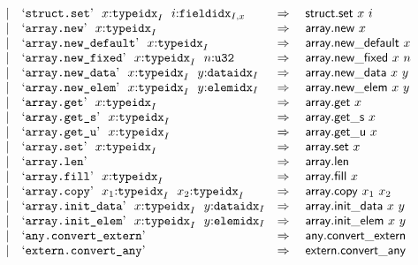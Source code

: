 $$\begin{array}[t]{@{}lrrl@{}l@{}l@{}l@{}}
& & | & \mbox{‘\texttt{struct.set}’}~~x{:}{{\mathtt{typeidx}}}_{I}~~i{:}{{\mathtt{fieldidx}}}_{I, x} & \quad\Rightarrow\quad{} & \mathsf{struct{.}set}~x~i \\
& & | & \mbox{‘\texttt{array.new}’}~~x{:}{{\mathtt{typeidx}}}_{I} & \quad\Rightarrow\quad{} & \mathsf{array{.}new}~x \\
& & | & \mbox{‘\texttt{array.new\_default}’}~~x{:}{{\mathtt{typeidx}}}_{I} & \quad\Rightarrow\quad{} & \mathsf{array{.}new\_default}~x \\
& & | & \mbox{‘\texttt{array.new\_fixed}’}~~x{:}{{\mathtt{typeidx}}}_{I}~~n{:}{\mathtt{u32}} & \quad\Rightarrow\quad{} & \mathsf{array{.}new\_fixed}~x~n \\
& & | & \mbox{‘\texttt{array.new\_data}’}~~x{:}{{\mathtt{typeidx}}}_{I}~~y{:}{{\mathtt{dataidx}}}_{I} & \quad\Rightarrow\quad{} & \mathsf{array{.}new\_data}~x~y \\
& & | & \mbox{‘\texttt{array.new\_elem}’}~~x{:}{{\mathtt{typeidx}}}_{I}~~y{:}{{\mathtt{elemidx}}}_{I} & \quad\Rightarrow\quad{} & \mathsf{array{.}new\_elem}~x~y \\
& & | & \mbox{‘\texttt{array.get}’}~~x{:}{{\mathtt{typeidx}}}_{I} & \quad\Rightarrow\quad{} & \mathsf{array{.}get}~x \\
& & | & \mbox{‘\texttt{array.get\_s}’}~~x{:}{{\mathtt{typeidx}}}_{I} & \quad\Rightarrow\quad{} & {\mathsf{array{.}get}}{\mathsf{\_}}{\mathsf{s}}~x \\
& & | & \mbox{‘\texttt{array.get\_u}’}~~x{:}{{\mathtt{typeidx}}}_{I} & \quad\Rightarrow\quad{} & {\mathsf{array{.}get}}{\mathsf{\_}}{\mathsf{u}}~x \\
& & | & \mbox{‘\texttt{array.set}’}~~x{:}{{\mathtt{typeidx}}}_{I} & \quad\Rightarrow\quad{} & \mathsf{array{.}set}~x \\
& & | & \mbox{‘\texttt{array.len}’} & \quad\Rightarrow\quad{} & \mathsf{array{.}len} \\
& & | & \mbox{‘\texttt{array.fill}’}~~x{:}{{\mathtt{typeidx}}}_{I} & \quad\Rightarrow\quad{} & \mathsf{array{.}fill}~x \\
& & | & \mbox{‘\texttt{array.copy}’}~~x_1{:}{{\mathtt{typeidx}}}_{I}~~x_2{:}{{\mathtt{typeidx}}}_{I} & \quad\Rightarrow\quad{} & \mathsf{array{.}copy}~x_1~x_2 \\
& & | & \mbox{‘\texttt{array.init\_data}’}~~x{:}{{\mathtt{typeidx}}}_{I}~~y{:}{{\mathtt{dataidx}}}_{I} & \quad\Rightarrow\quad{} & \mathsf{array{.}init\_data}~x~y \\
& & | & \mbox{‘\texttt{array.init\_elem}’}~~x{:}{{\mathtt{typeidx}}}_{I}~~y{:}{{\mathtt{elemidx}}}_{I} & \quad\Rightarrow\quad{} & \mathsf{array{.}init\_elem}~x~y \\
& & | & \mbox{‘\texttt{any.convert\_extern}’} & \quad\Rightarrow\quad{} & \mathsf{any{.}convert\_extern} \\
& & | & \mbox{‘\texttt{extern.convert\_any}’} & \quad\Rightarrow\quad{} & \mathsf{extern{.}convert\_any} \\
\end{array}
$$

